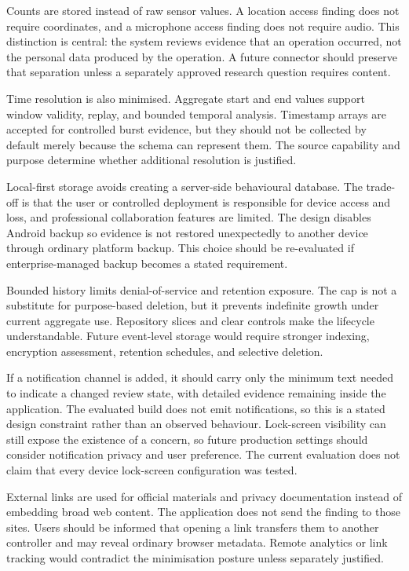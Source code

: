 Counts are stored instead of raw sensor values. A location access finding does not require coordinates, and a microphone access finding does not require audio. This distinction is central: the system reviews evidence that an operation occurred, not the personal data produced by the operation. A future connector should preserve that separation unless a separately approved research question requires content.

Time resolution is also minimised. Aggregate start and end values support window validity, replay, and bounded temporal analysis. Timestamp arrays are accepted for controlled burst evidence, but they should not be collected by default merely because the schema can represent them. The source capability and purpose determine whether additional resolution is justified.

Local-first storage avoids creating a server-side behavioural database. The trade-off is that the user or controlled deployment is responsible for device access and loss, and professional collaboration features are limited. The design disables Android backup so evidence is not restored unexpectedly to another device through ordinary platform backup. This choice should be re-evaluated if enterprise-managed backup becomes a stated requirement.

Bounded history limits denial-of-service and retention exposure. The cap is not a substitute for purpose-based deletion, but it prevents indefinite growth under current aggregate use. Repository slices and clear controls make the lifecycle understandable. Future event-level storage would require stronger indexing, encryption assessment, retention schedules, and selective deletion.

If a notification channel is added, it should carry only the minimum text needed to indicate a changed review state, with detailed evidence remaining inside the application. The evaluated build does not emit notifications, so this is a stated design constraint rather than an observed behaviour. Lock-screen visibility can still expose the existence of a concern, so future production settings should consider notification privacy and user preference. The current evaluation does not claim that every device lock-screen configuration was tested.

External links are used for official materials and privacy documentation instead of embedding broad web content. The application does not send the finding to those sites. Users should be informed that opening a link transfers them to another controller and may reveal ordinary browser metadata. Remote analytics or link tracking would contradict the minimisation posture unless separately justified.

